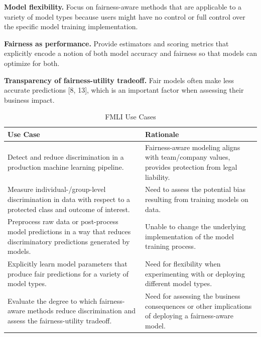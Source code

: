 \documentclass{{interact/interact}}
\begin{document}
\begin{hangparas}{.15in}{1}
  \textbf{Model flexibility.} Focus on fairness-aware methods that are applicable
    to a variety of model types because users might have no control or full
    control over the specific model training implementation.
\end{hangparas}
\begin{hangparas}{.15in}{1}
  \textbf{Fairness as performance.} Provide estimators and scoring metrics that
    explicitly encode a notion of both model accuracy and fairness so that models
    can optimize for both.
\end{hangparas}
\begin{hangparas}{.15in}{1}
\textbf{Transparency of fairness-utility tradeoff.} Fair models often make less
  accurate predictions [8, 13], which is an important factor when assessing
  their business impact.
\end{hangparas}

\begin{table}
  \caption{FMLI Use Cases}
  \renewcommand{\arraystretch}{1.75}
  \small\noindent\begin{tabularx}{\linewidth}{X X}
    \textbf{Use Case} & \textbf{Rationale} \\
    \hline
    Detect and reduce discrimination in a production machine learning pipeline.
      & Fairness-aware modeling aligns with team/company values,
        provides protection from legal liability. \\
    Measure individual-/group-level discrimination in data with respect to a
    protected class and outcome of interest.
      & Need to assess the potential bias resulting from training models on
        data. \\
    Preprocess raw data or post-process model predictions in a way that reduces
    discriminatory predictions generated by models.
      & Unable to change the underlying implementation of the model training
        process. \\
    Explicitly learn model parameters that produce fair predictions for a variety
    of model types.
      & Need for flexibility when experimenting with or deploying different model
        types. \\
    Evaluate the degree to which fairness-aware methods reduce discrimination
    and assess the fairness-utility tradeoff.
      & Need for assessing the business consequences or other implications of
        deploying a fairness-aware model.
  \end{tabularx}
\end{table}
\end{document}
